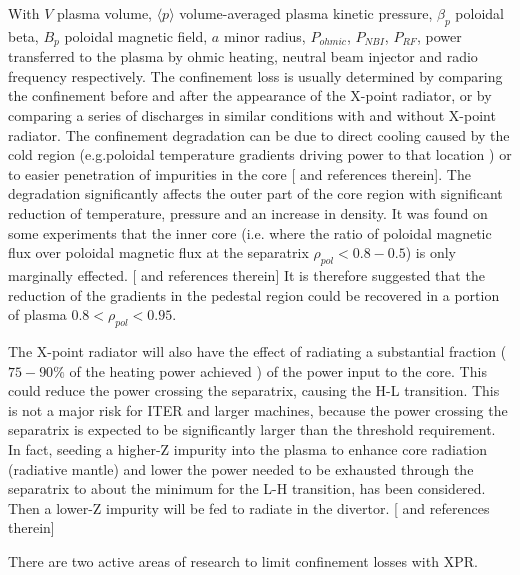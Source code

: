 With $V$ plasma volume, $\langle p \rangle$ volume-averaged plasma kinetic pressure, ${{ \beta }_{ p }}$ poloidal beta, $B_p$ poloidal magnetic field, $a$ minor radius, $P_{ohmic}$, $P_{NBI}$, $P_{RF}$, power transferred to the plasma by ohmic heating, neutral beam injector and radio frequency respectively. \cite{SalarElahi2010,Wesson2011} The confinement loss is usually determined by comparing the confinement before and after the appearance of the X-point radiator, or by comparing a series of discharges in similar conditions with and without X-point radiator.
The confinement degradation can be due to direct cooling caused by the cold region (e.g.poloidal temperature gradients driving power to that location \cite{Lipschultz1998} ) or to easier penetration of impurities in the core [\cite{Lipschultz2016} and references therein]. The degradation significantly affects the outer part of the core region with significant reduction of temperature, pressure and an increase in density. \cite{Kallenbach2015a}  It was found on some experiments that the inner core (i.e. where the ratio of poloidal magnetic flux over poloidal magnetic flux at the separatrix $ \rho _{pol}<0.8-0.5 $) is only marginally effected. [\cite{Reinke2013} and references therein] It is therefore suggested that the reduction of the gradients in the pedestal region could be recovered in a portion of plasma $0.8< \rho _{pol}<0.95$. \cite{Reimold2015}

The X-point radiator will also have the effect of radiating a substantial fraction ($75-90\%$ of the heating power achieved \cite{Bernert2017}) of the power input to the core. This could reduce the power crossing the separatrix, causing the H-L transition. This is not a major risk for ITER and larger machines, because the power crossing the separatrix is expected to be significantly larger than the threshold requirement. In fact, seeding a higher-Z impurity into the plasma to enhance core radiation (radiative mantle) and lower the power needed to be exhausted through the separatrix to about the minimum for the L-H transition, has been considered. Then a lower-Z impurity will be fed to radiate in the divertor. [\cite{Kallenbach2015a,Reinke2013} and references therein]


There are two active areas of research to limit confinement losses with XPR.

